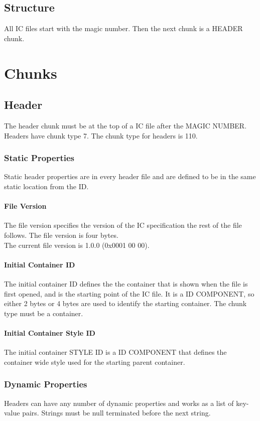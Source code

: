 \documentclass{report}
\begin{document}
\section{Structure}
All IC files start with the magic number. Then the next chunk is a HEADER chunk.
\chapter{Chunks}

\section{Header}
The header chunk must be at the top of a IC file after the MAGIC NUMBER. 
Headers have chunk type 7.
The chunk type for headers is 110. 

\subsection{Static Properties}
Static header properties are in every header file and are defined to be in the same static location from the ID. 

\subsubsection{File Version}
The file version specifies the version of the IC specification the rest of the file follows. The file version is four bytes.\\
The current file version is 1.0.0 (0x0001 00 00).

\subsubsection{Initial Container ID}
The initial container ID defines the the container that is shown when the file is first opened, and is the starting point of the IC file. It is a ID COMPONENT, so either 2 bytes or 4 bytes are used to identify the starting container. The chunk type must be a container.

\subsubsection{Initial Container Style ID}
The initial container STYLE ID is a ID COMPONENT that defines the container wide style used for the starting parent container.

\subsection{Dynamic Properties}
Headers can have any number of dynamic properties and works as a list of key-value pairs. Strings must be null terminated before the next string.
\end{document}
